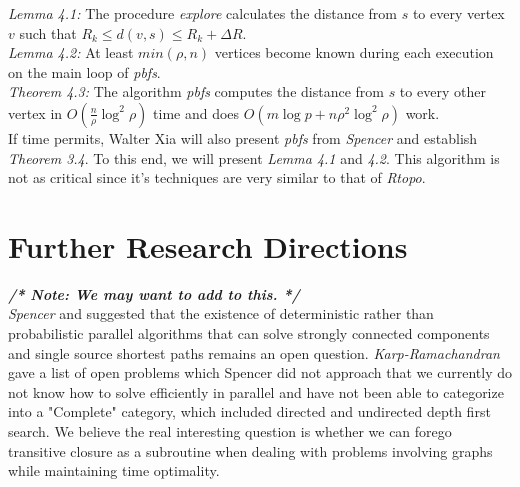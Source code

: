 \documentclass[paper=a4, fontsize=11pt]{scrartcl} %
\numberwithin{equation}{section} %
\numberwithin{figure}{section} %
\numberwithin{table}{section} %
\begin{document}
\textit{Lemma 4.1:} The procedure \textit{explore} calculates the distance from $s$ to every vertex $v$ such that $R_k \leq d(v,s) \leq R_k + \Delta{R}$.\\

\textit{Lemma 4.2:} At least $min(\rho,n)$ vertices become known during each execution on the main loop of \textit{pbfs}.\\

\textit{Theorem 4.3:} The algorithm \textit{pbfs} computes the distance from $s$ to every other vertex in $O(\frac{n}{\rho}\log^2{\rho})$ time and does $O(m\log{p} + n\rho^2\log^2{\rho})$ work.\\

If time permits, Walter Xia will also present \textit{pbfs} from \textit{Spencer\cite{S97}} and establish \textit{Theorem 3.4}. To this end, we will present \textit{Lemma 4.1} and \textit{4.2}. This algorithm is not as critical since it's techniques are very similar to that of \textit{Rtopo}.


\section{Further Research Directions}
\textbf{\textit{/* Note: We may want to add to this. */}}\\
\textit{Spencer\cite{S97}} and  suggested that the existence of deterministic rather than probabilistic parallel algorithms that can solve strongly connected components and single source shortest paths remains an open question. \textit{Karp-Ramachandran\cite{KR90}} gave a list of open problems which Spencer did not approach that we currently do not know how to solve efficiently in parallel and have not been able to categorize into a "Complete" category, which included directed and  undirected depth first search. We believe the real interesting question is whether we can forego transitive closure as a subroutine when dealing with problems involving graphs while maintaining time optimality.






\end{document}
